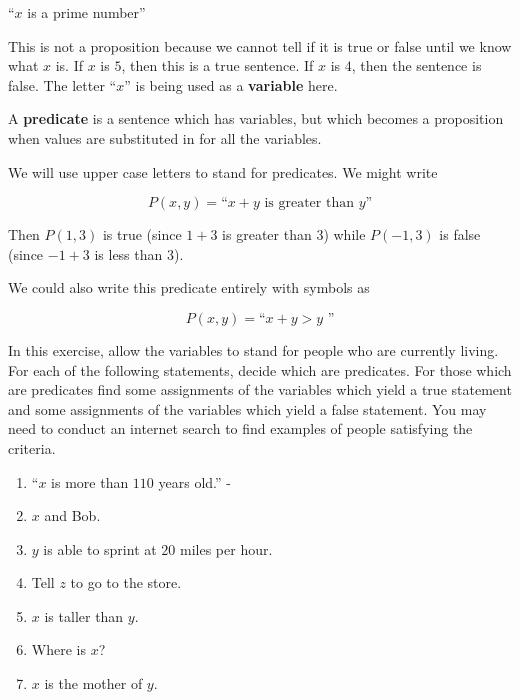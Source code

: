 \begin{center}
	``$x$ is a prime number''
\end{center}

This is not a proposition because we cannot tell if it is true or false until we know what $x$ is.  If $x$ is $5$, then this is a true sentence.  If $x$ is $4$, then the sentence is false.  The letter ``$x$'' is being used as a \textbf{variable} here.  

\begin{definition} 
	A \textbf{predicate} is a sentence which has variables, but which becomes a proposition when values are substituted in for all the variables.
\end{definition}

We will use upper case letters to stand for predicates.   We might write

\[
P(x,y) =  \textrm{``$x+ y$ is greater than $y$''} 
\]

Then $P(1,3)$ is true (since $1+3$ is greater than $3$) while $P(-1,3)$ is false (since $-1+3$ is less than $3$).

We could also write this predicate entirely with symbols as 

\[
P(x,y) =  \textrm{``$x+ y > y$ ''} 
\]


\begin{xca} In this exercise, allow the variables to stand for people who are currently living.  For each of the following statements, decide which are predicates.  For those which are predicates find some assignments of the variables which yield a true statement and some assignments of the variables which yield a false statement.  You may need to conduct an internet search to find examples of people satisfying the criteria.
	\begin{enumerate}
		\item ``$x$ is more than $110$ years old.'' - 
		\item $x$ and Bob.
		\item $y$ is able to sprint at $20$ miles per hour.
		\item Tell $z$ to go to the store.
		\item $x$ is taller than $y$.
		\item Where is $x$?
		\item $x$ is the mother of $y$.
	\end{enumerate}
	
\end{xca}

